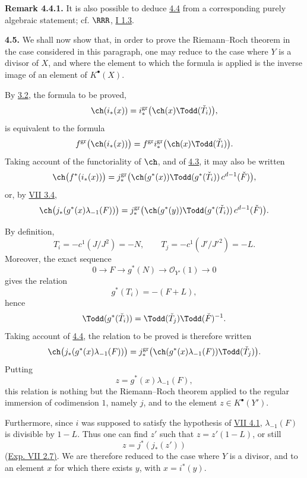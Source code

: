 \textbf{Remark 4.4.1.} It is also possible to deduce \hyperlink{sga6.e08.prop.4-4}{4.4} from a corresponding purely algebraic statement; cf. \(\RRR\), \hyperlink{sga6.e01.sec.1.3}{I 1.3}.

\textbf{4.5.} We shall now show that, in order to prove the Riemann--Roch theorem in the case considered in this paragraph, one may reduce to the case where \(Y\) is a divisor of \(X\), and where the element to which the formula is applied is the inverse image of an element of \(K^{\bullet}(X)\).

By \hyperlink{sga6.e08.prop.3-2}{3.2}, the formula to be proved,
\[
 \ch(i_*(x))=
 i^{\mathrm{gr}}_*\bigl(\ch(x)\Todd(\check T_i)\bigr),
\]
is equivalent to the formula
\[
 f^{\mathrm{gr}}\bigl(\ch(i_*(x))\bigr)
 =
 f^{\mathrm{gr}}i^{\mathrm{gr}}_*\bigl(\ch(x)\Todd(\check T_i)\bigr).
\]
Taking account of the functoriality of \(\ch\), and of \hyperlink{sga6.e08.prop.4-3}{4.3}, it may also be written
\[
 \ch\bigl(f^*(i_*(x))\bigr)
 =
 j^{\mathrm{gr}}_*\bigl(\ch(g^*(x))\Todd(g^*(\check T_i))\,c^{d-1}(\check F)\bigr),
\]
or, by \hyperlink{sga6.e07.prop.3-4}{VII 3.4},
\[
 \ch\bigl(j_*(g^*(x)\lambda_{-1}(F))\bigr)
 =
 j^{\mathrm{gr}}_*\bigl(\ch(g^*(y))\Todd(g^*(\check T_i))\,c^{d-1}(\check F)\bigr).
\]

By definition,
\[
 T_i=-c^1(J/J^2)=-N,\qquad
 T_j=-c^1(J'/J'^2)=-L.
\]
Moreover, the exact sequence
\[
0\longrightarrow F\longrightarrow g^*(N)\longrightarrow \mathcal O_{Y'}(1)\longrightarrow0
\]
gives the relation
\[
 g^*(T_i)=-(F+L),
\]
hence
\[
 \Todd(g^*(\check T_i))=\Todd(\check T_j)\Todd(\check F)^{-1}.
\]
Taking account of \hyperlink{sga6.e08.prop.4-4}{4.4}, the relation to be proved is therefore written
\[
 \ch\bigl(j_*(g^*(x)\lambda_{-1}(F))\bigr)
 =
 j^{\mathrm{gr}}_*\bigl(\ch(g^*(x)\lambda_{-1}(F))\Todd(\check T_j)\bigr).
\]
Putting
\[
z=g^*(x)\lambda_{-1}(F),
\]
this relation is nothing but the Riemann--Roch theorem applied to the regular immersion of codimension \(1\), namely \(j\), and to the element \(z\in K^{\bullet}(Y')\).

Furthermore, since \(i\) was supposed to satisfy the hypothesis of \hyperlink{sga6.e07.lem.4-1}{VII 4.1}, \(\lambda_{-1}(F)\) is divisible by \(1-L\). Thus one can find \(z'\) such that \(z=z'(1-L)\), or still
\[
 z=j^*(j_*(z'))
\]
(\hyperlink{sga6.e07.para.2-6}{Exp. VII 2.7)}. We are therefore reduced to the case where \(Y\) is a divisor, and to an element \(x\) for which there exists \(y\), with \(x=i^*(y)\).

